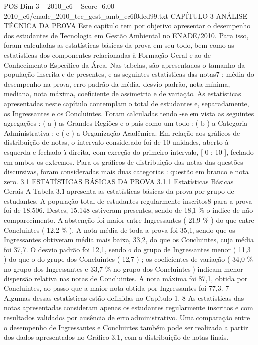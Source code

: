 \begin{textsample}{POS Dim 3 – 2010\_c6 – Score -6.00 – 2010\_c6/enade\_2010\_tec\_gest\_amb\_ee6f0ded99.txt}  \label{ex:f3_pos_266}
CAPÍTULO 3 ANÁLISE TÉCNICA DA PROVA Este capítulo tem por objetivo apresentar o desempenho dos estudantes de Tecnologia em Gestão Ambiental no ENADE/2010.
Para isso, foram calculadas as estatísticas básicas da prova em seu todo, bem como as estatísticas dos componentes relacionadas à Formação Geral e ao de Conhecimento Específico da Área.
Nas tabelas, são apresentados o tamanho da população inscrita e de presentes, e as seguintes estatísticas das notas7 : média do desempenho na prova, erro padrão da média, desvio padrão, nota mínima, mediana, nota máxima, coeficiente de assimetria e de variação.
As estatísticas apresentadas neste capítulo contemplam o total de estudantes e, separadamente, os Ingressantes e os Concluintes.
Foram calculadas tendo -se em vista as seguintes agregações : ( a ) as Grandes Regiões e o país como um todo ; ( b ) a Categoria Administrativa ; e ( c ) a Organização Acadêmica.
Em relação aos gráficos de distribuição de notas, o intervalo considerado foi de 10 unidades, aberto à esquerda e fechado à direita, com exceção do primeiro intervalo, [ 0 ; 10 ], fechado em ambos os extremos.
Para os gráficos de distribuição das notas das questões discursivas, foram consideradas mais duas categorias : questão em branco e nota zero. 3.1 ESTATÍSTICAS BÁSICAS DA PROVA 3.1.1 Estatísticas Básicas Gerais A Tabela 3.1 apresenta as estatísticas básicas da prova por grupo de estudantes.
A população total de estudantes regularmente inscritos8 para a prova foi de 18.506.
Destes, 15.148 estiveram presentes, sendo de 18,1 \% o índice de não comparecimento.
A abstenção foi maior entre Ingressantes ( 21,9 \% ) do que entre Concluintes ( 12,2 \% ).
A nota média de toda a prova foi 35,1, sendo que os Ingressantes obtiveram média mais baixa, 33,2, do que os Concluintes, cuja média foi 37,7.
O desvio padrão foi 12,1, sendo o do grupo de Ingressantes menor ( 11,3 ) do que o do grupo dos Concluintes ( 12,7 ) ; os coeficientes de variação ( 34,0 \% no grupo dos Ingressantes e 33,7 \% no grupo dos Concluintes ) indicam menor dispersão relativa nas notas de Concluintes.
A nota máxima foi 87,1, obtida por Concluintes, ao passo que a maior nota obtida por Ingressantes foi 77,3. 7 Algumas dessas estatísticas estão definidas no Capítulo 1. 8 As estatísticas das notas apresentadas consideram apenas os estudantes regularmente inscritos e com resultados validados por ausência de erro administrativo.
Uma comparação entre o desempenho de Ingressantes e Concluintes também pode ser realizada a partir dos dados apresentados no Gráfico 3.1, com a distribuição de notas finais.

\end{textsample}
